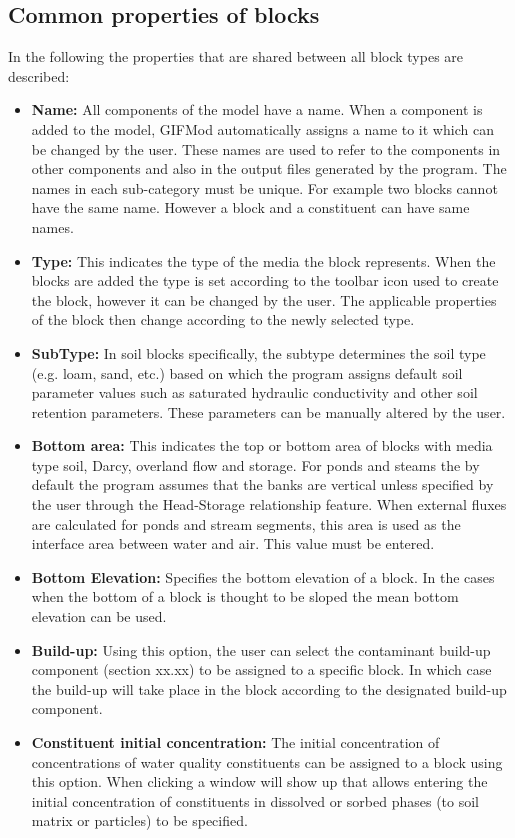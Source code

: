 \subsection{Common properties of blocks}
In the following the properties that are shared between all block types are described: 
\begin{itemize}
\item \textbf{Name: } All components of the model have a name. When a component is added to the model, GIFMod automatically assigns a name to it which can be changed by the user. These names are used to refer to the components in other components and also in the output files generated by the program. The names in each sub-category must be unique. For example two blocks cannot have the same name. However a block and a constituent can have same names. 
\item \textbf{Type:} This indicates the type of the media the block represents. When the blocks are added the type is set according to the toolbar icon used to create the block, however it can be changed by the user. The applicable properties of the block then change according to the newly selected type. 
\item \textbf{SubType:} In soil blocks specifically, the subtype determines the soil type (e.g. loam, sand, etc.) based on which the program assigns default soil parameter values such as saturated hydraulic conductivity and other soil retention parameters. These parameters can be manually altered by the user. 
\item \textbf{Bottom area:} This indicates the top or bottom area of blocks with media type soil, Darcy, overland flow and storage. For ponds and steams the by default the program assumes that the banks are vertical unless specified by the user through the Head-Storage relationship feature. When external fluxes are calculated for ponds and stream segments, this area is used as the interface area between water and air.  This value must be entered. 
\item \textbf{Bottom Elevation: } Specifies the bottom elevation of a block. In the cases when the bottom of a block is thought to be sloped the mean bottom elevation can be used. 
\item \textbf{Build-up: } Using this option, the user can select the contaminant build-up component (section xx.xx) to be assigned to a specific block. In which case the build-up will take place in the block according to the designated build-up component. 
\item \textbf{Constituent initial concentration: } The initial concentration of concentrations of water quality constituents can be assigned to a block using this option. When clicking a window will show up that allows entering the initial concentration of constituents in dissolved or sorbed phases (to soil matrix or particles) to be specified. 

\end{itemize}
